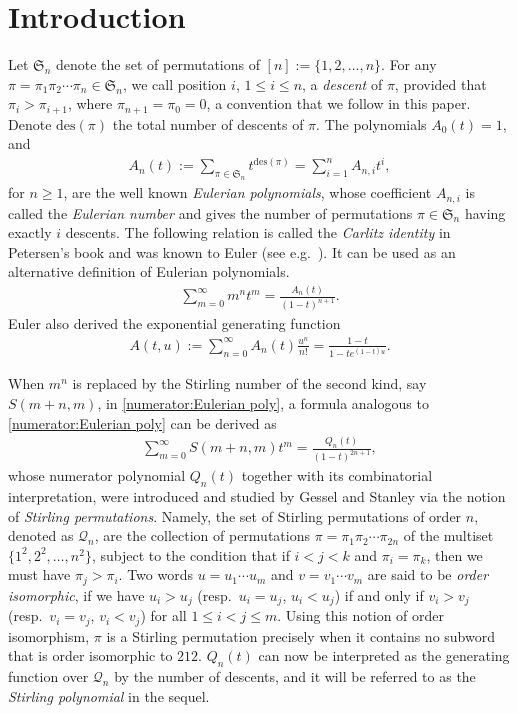 \documentclass[11pt,reqno]{amsart}
\numberwithin{equation}{section}
\theoremstyle{plain}
\theoremstyle{definition}
\newcommand{\s}{\mathfrak{S}}
\newcommand{\Q}{\mathcal{Q}}
\def\des{\mathrm{des}}
\begin{document}
\section{Introduction}\label{sect: intro}


Let $\s_n$ denote the set of permutations of $[n]:=\{1,2,\ldots,n\}$. For any $\pi=\pi_1\pi_2\cdots\pi_n\in\s_n$, we call position $i$, $1\le i\le n$, a {\em descent} of $\pi$, provided that $\pi_i>\pi_{i+1}$, where $\pi_{n+1}=\pi_0=0$, a convention that we follow in this paper. Denote $\des(\pi)$ the total number of descents of $\pi$. The polynomials $A_0(t)=1$, and
\begin{align}\label{comb:Eulerian poly}
A_n(t):=\sum_{\pi\in\s_n}t^{\des(\pi)}=\sum_{i=1}^{n}A_{n,i}t^i,
\end{align}
for $n\ge 1$, are the well known {\em Eulerian polynomials}, whose coefficient $A_{n,i}$ is called the {\em Eulerian number} and gives the number of permutations $\pi\in\s_n$ having exactly $i$ descents. The following relation is called the {\em Carlitz identity} in Petersen's book \cite{Petbook} and was known to Euler (see e.g.~\cite{Foa}). It can be used as an alternative definition of Eulerian polynomials.
\begin{align}\label{numerator:Eulerian poly}
\sum_{m=0}^{\infty}m^n t^m = \frac{A_n(t)}{(1-t)^{n+1}}.
\end{align}
Euler also derived the exponential generating function
\begin{align}\label{gf:Eulerian poly}
A(t,u):=\sum_{n=0}^{\infty}A_n(t)\frac{u^n}{n!}=\frac{1-t}{1-te^{(1-t)u}}.
\end{align}

When $m^n$ is replaced by the Stirling number of the second kind, say $S(m+n,m)$, in \eqref{numerator:Eulerian poly}, a formula analogous to \eqref{numerator:Eulerian poly} can be derived as
\begin{align}\label{numerator:Stirling perm}
\sum_{m=0}^{\infty}S(m+n,m)t^m=\frac{Q_n(t)}{(1-t)^{2n+1}},
\end{align} 
whose numerator polynomial $Q_n(t)$ together with its combinatorial interpretation, were introduced and studied by Gessel and Stanley \cite{GS} via the notion of \emph{Stirling permutations}. Namely, the set of Stirling permutations of order $n$, denoted as $\Q_n$, are the collection of permutations $\pi=\pi_1\pi_2\cdots\pi_{2n}$ of the multiset $\{1^2,2^2,\ldots,n^2\}$, subject to the condition that if $i<j<k$ and $\pi_i=\pi_k$, then we must have $\pi_j>\pi_i$. Two words $u=u_1\cdots u_m$ and $v=v_1\cdots v_m$ are said to be {\em order isomorphic}, if we have $u_i>u_j$ (resp.~$u_i=u_j$, $u_i<u_j$) if and only if $v_i>v_j$ (resp.~$v_i=v_j$, $v_i<v_j$) for all $1\le i<j\le m$. Using this notion of order isomorphism, $\pi$ is a Stirling permutation precisely when it contains no subword that is order isomorphic to $212$. $Q_n(t)$ can now be interpreted as the generating function over $\Q_n$ by the number of descents, and it will be referred to as the {\em Stirling polynomial} in the sequel.
\end{document}
